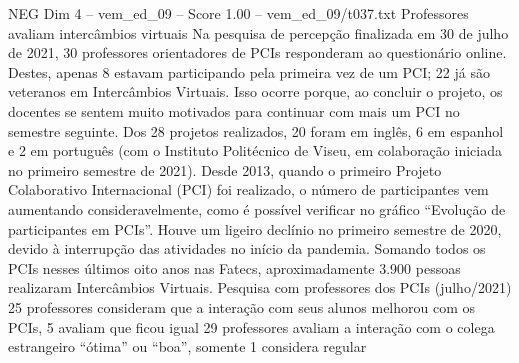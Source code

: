 \begin{textsample}{NEG Dim 4 – vem\_ed\_09 – Score 1.00 – vem\_ed\_09/t037.txt}  \label{ex:f4_neg_010}
Professores avaliam intercâmbios virtuais Na pesquisa de percepção finalizada em 30 de julho de 2021, 30 professores orientadores de PCIs responderam ao questionário online.
Destes, apenas 8 estavam participando pela primeira vez de um PCI; 22 já são veteranos em Intercâmbios Virtuais.
Isso ocorre porque, ao concluir o projeto, os docentes se sentem muito motivados para continuar com mais um PCI no semestre seguinte.
Dos 28 projetos realizados, 20 foram em inglês, 6 em espanhol e 2 em português (com o Instituto Politécnico de Viseu, em colaboração iniciada no primeiro semestre de 2021).
Desde 2013, quando o primeiro Projeto Colaborativo Internacional (PCI) foi realizado, o número de participantes vem aumentando consideravelmente, como é possível verificar no gráfico “Evolução de participantes em PCIs”.
Houve um ligeiro declínio no primeiro semestre de 2020, devido à interrupção das atividades no início da pandemia.
Somando todos os PCIs nesses últimos oito anos nas Fatecs, aproximadamente 3.900 pessoas realizaram Intercâmbios Virtuais.
Pesquisa com professores dos PCIs (julho/2021) 25 professores consideram que a interação com seus alunos melhorou com os PCIs, 5 avaliam que ficou igual 29 professores avaliam a interação com o colega estrangeiro “ótima” ou “boa”, somente 1 considera regular

\end{textsample}
